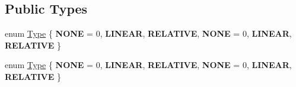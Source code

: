 \subsection*{Public Types}
\begin{DoxyCompactItemize}
\item 
enum \hyperlink{classui_1_1LayoutParameter_a1b01e01e7e6fc3de80f2e6d07fae806e}{Type} \{ \newline
{\bfseries N\+O\+NE} = 0, 
{\bfseries L\+I\+N\+E\+AR}, 
{\bfseries R\+E\+L\+A\+T\+I\+VE}, 
{\bfseries N\+O\+NE} = 0, 
\newline
{\bfseries L\+I\+N\+E\+AR}, 
{\bfseries R\+E\+L\+A\+T\+I\+VE}
 \}
\item 
enum \hyperlink{classui_1_1LayoutParameter_a1b01e01e7e6fc3de80f2e6d07fae806e}{Type} \{ \newline
{\bfseries N\+O\+NE} = 0, 
{\bfseries L\+I\+N\+E\+AR}, 
{\bfseries R\+E\+L\+A\+T\+I\+VE}, 
{\bfseries N\+O\+NE} = 0, 
\newline
{\bfseries L\+I\+N\+E\+AR}, 
{\bfseries R\+E\+L\+A\+T\+I\+VE}
 \}
\end{DoxyCompactItemize}
